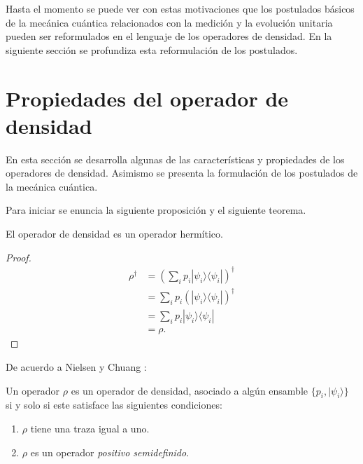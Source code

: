 Hasta el momento se puede ver con estas motivaciones que los postulados básicos de la mecánica cuántica relacionados con la medición y la evolución unitaria pueden ser reformulados en el lenguaje de los operadores de densidad. En la siguiente sección se profundiza esta reformulación de los postulados.


\section{Propiedades del operador de densidad}\label{postulates} %

En esta sección se desarrolla algunas de las características y propiedades de
los operadores de densidad. Asimismo se presenta la formulación de los
postulados de la mecánica cuántica. 

Para iniciar se enuncia la siguiente proposición y el siguiente teorema. 

\begin{proposition}El operador de densidad es un operador hermítico.
	
\end{proposition}


\begin{proof}
	\begin{equation}
		\begin{split}
			\rho^\dagger&={\left(\sum_{i} p_i|\psi_i\rangle \langle \psi_i|\right)}^{\dagger}\\
			&=\sum_{i} p_i {\left(|\psi_i\rangle \langle\psi_i|\right)}^{\dagger}\\
			&=\sum_{i} p_i |\psi_i\rangle \langle\psi_i|\\
			&=\rho.
		\end{split}
	\end{equation}
	
\end{proof}

De acuerdo a Nielsen y Chuang {\cite{nielsen_chuang_2010}}:\begin{theorem} Un operador $\rho$ es un operador de densidad, asociado a algún ensamble $\{p_i, |\psi_i\rangle\}$ si y solo si este satisface las siguientes condiciones:
\begin{enumerate}
	\item $\rho$ tiene una traza igual a uno.
	\item $\rho $ es un operador \textit{positivo semidefinido}.
\end{enumerate}	
\end{theorem}


